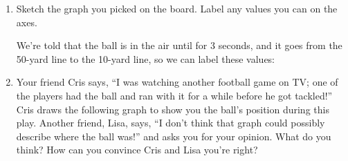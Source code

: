 \documentclass{article}
\begin{document}
\begin{enumerate}
\begin{enumerate}
    \begin{solution}
      The ball goes from the 50-yard line to the 10-yard line, so its position (which yard line it's at) decreases as time goes on. The only graph that matches this is .
    \end{solution}

  \item


    \begin{problem}[\newpage]
      Sketch the graph you picked on the board. Label any values you
      can on the axes.
    \end{problem}

    \begin{solution}
      We're told that the ball is in the air until for 3 seconds, and
      it goes from the 50-yard line to the 10-yard line, so we can
      label these values:      
      \begin{center}
      \end{center}
    \end{solution}

  \item \label{function-football-not-function}


    \begin{problem}[\vfill]
      Your friend Cris says, ``I was watching another football game on TV; one of the players had the ball and ran with it for a while before he got tackled!'' Cris draws the following graph to show you the ball's position during this play. Another friend, Lisa, says, ``I don't think that graph could possibly describe where the ball was!'' and asks you for your opinion. What do you think? How can you convince Cris and Lisa you're right?


\end{problem}
\end{enumerate}
\end{enumerate}
\end{document}
